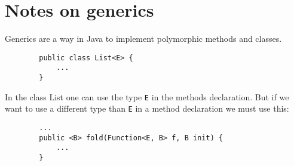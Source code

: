 \documentclass{article}
\begin{document}
	\section{Notes on generics}	
	Generics are a way in Java to implement polymorphic methods and classes.
	\begin{verbatim}
		public class List<E> {
		    ...
		}
	\end{verbatim}
	
	In the class List one can use the type \verb|E| in the methods declaration.
	But if we want to use a different type than \verb|E| in a method declaration we must use this:
	\begin{verbatim}
		...
		public <B> fold(Function<E, B> f, B init) {
		    ...
		}
	\end{verbatim}
\end{document}
